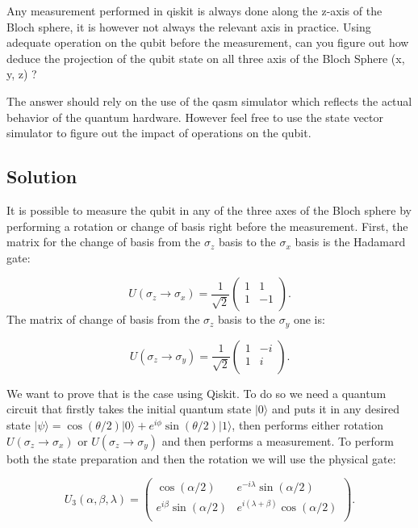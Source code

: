 \documentclass[12pt]{article}
\begin{document}
\begin{appendices}
Any measurement performed in qiskit is always done along the z-axis of the Bloch sphere, it is however not always the relevant axis in practice. Using adequate operation on the qubit before the measurement, can you figure out how deduce the projection of the qubit state on all three axis of the Bloch Sphere (x, y, z) ? 

The answer should rely on the use of the qasm simulator which reflects the actual behavior of the quantum hardware. However feel free to use the state vector simulator to figure out the impact of operations on the qubit.

\subsection*{Solution}



It is possible to measure the qubit in any of the three axes of the Bloch sphere by performing a rotation or change of basis right before the measurement. First, the matrix for the change of basis from the $\sigma_z$ basis to the $\sigma_x$ basis is the Hadamard gate:


$$ U(\sigma_z \to \sigma_x) =\frac{1}{\sqrt{2}}\begin{pmatrix}
1&1\\
1&-1\\
\end{pmatrix}.$$
The matrix of change of basis from the $\sigma_z$ basis to the $\sigma_y$ one is:

$$ U(\sigma_z \to \sigma_y) =\frac{1}{\sqrt{2}}\begin{pmatrix}
1&-i\\
1&i\\
\end{pmatrix}.$$

We want to prove that is the case using Qiskit. To do so we need a quantum circuit that firstly takes the initial quantum state $|0\rangle$ and puts it in any desired state $|\psi\rangle = \cos(\theta /2)|0\rangle + e^{i\phi}\sin(\theta /2)|1\rangle$, then performs either rotation $ U(\sigma_z \to \sigma_x)$ or $ U(\sigma_z \to \sigma_y)$ and then performs a measurement. To perform both the state preparation and then the rotation we will use the physical gate:

$$ U_3(\alpha, \beta, \lambda) =\begin{pmatrix}
\cos(\alpha/2)&e^{-i\lambda}\sin(\alpha/2)\\
e^{i\beta}\sin(\alpha/2)&e^{i(\lambda+\beta)}\cos(\alpha/2)\\
\end{pmatrix}.$$


\end{appendices}
\end{document}
